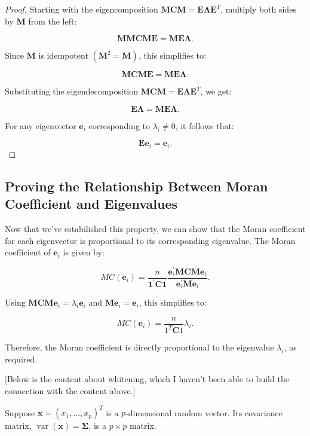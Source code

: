 \documentclass[12pt]{article}
\begin{document}
\begin{proof}
  Starting with the eigencomposition \( \mathbf{M C M}=\mathbf{E} \boldsymbol{\Lambda} \mathbf{E}^{T} \), multiply both sides by \( \mathbf{M} \) from the left:

  \[
    \mathbf{M M C M E} = \mathbf{M E} \boldsymbol{\Lambda}.
  \]

  Since \( \mathbf{M} \) is idempotent \( (\mathbf{M}^2 = \mathbf{M}) \), this simplifies to:

  \[
    \mathbf{M C M E} = \mathbf{M E} \boldsymbol{\Lambda}.
  \]

  Substituting the eigendecomposition \( \mathbf{M C M} = \mathbf{E} \boldsymbol{\Lambda} \mathbf{E}^T \), we get:

  \[
    \mathbf{E} \boldsymbol{\Lambda} = \mathbf{M E} \boldsymbol{\Lambda}.
  \]

  For any eigenvector \( \mathbf{e}_i \) corresponding to \( \lambda_i \neq 0 \), it follows that:

  \[
    \mathbf{E e}_i = \mathbf{e}_i.
  \]
\end{proof}

\subsection*{Proving the Relationship Between Moran Coefficient and Eigenvalues}

Now that we've estabilished this property, we can show that the Moran coefficient for each eigenvector is proportional to its corresponding eigenvalue. The Moran coefficient of \( \mathbf{e}_i \) is given by:

\[
  M C\left(\mathbf{e}_i\right)=\frac{n}{\mathbf{1}^{\prime} \mathbf{C} \mathbf{1}} \frac{\mathbf{e}_i^{\prime} \mathbf{M C M e}_i}{\mathbf{e}_i^{\prime} \mathbf{M e}_i} .
\]

Using \( \mathbf{M C M e}_i = \lambda_i \mathbf{e}_i \) and \( \mathbf{M e}_i = \mathbf{e}_i \), this simplifies to:

\[
  M C\left(\mathbf{e}_i\right)=\frac{n}{1^T \mathbf{C} 1} \lambda_i.
\]

Therefore, the Moran coefficient is directly proportional to the eigenvalue \( \lambda_i \), as required.

[Below is the content about whitening, which I haven't been able to build the connection with the content above.]

Suppose \( \mathbf{x}=\left(x_1, \ldots, x_p\right)^T \) is a \( p \)-dimensional random vector. Its covariance matrix, \( \operatorname{var} (\mathbf{x}) = \boldsymbol{\Sigma} \), is a  \( p \times p \) matrix.
\end{document}
